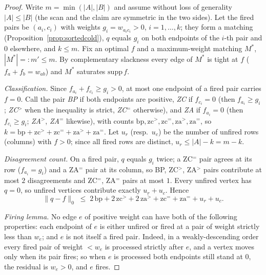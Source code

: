 \begin{proof}
Write $m=\min(|A|,|B|)$ and assume without loss of generality $|A| \le |B|$ (the
scan and the claim are symmetric in the two sides).  Let the fired pairs be
$(a_i,c_i)$ with weights $g_i = w_{a_i c_i} > 0$, $i = 1,\dots,k$; they form a
matching (Proposition~\ref{prop:sortedcold}), $q$ equals $g_i$ on both endpoints
of the $i$-th pair and $0$ elsewhere, and $k \le m$.  Fix an optimal $f$ and a
maximum-weight matching $M^*$, $|M^*| =: m' \le m$.  By complementary slackness
every edge of $M^*$ is tight at $f$ ($f_a + f_b = w_{ab}$) and $M^*$ saturates
$\mathrm{supp}\, f$.

\emph{Classification.}  Since $f_{a_i}+f_{c_i}\ge g_i>0$, at most one endpoint of
a fired pair carries $f=0$.  Call the pair \emph{BP} if both endpoints are
positive, \emph{ZC} if $f_{c_i}=0$ (then $f_{a_i}\ge g_i$; \emph{ZC$^>$} when the
inequality is strict, \emph{ZC$^=$} otherwise), and \emph{ZA} if $f_{a_i}=0$
(then $f_{c_i}\ge g_i$; \emph{ZA$^>$}, \emph{ZA$^=$} likewise), with counts
$\mathrm{bp},\mathrm{zc}^>,\mathrm{zc}^=,\mathrm{za}^>,\mathrm{za}^=$, so
$k=\mathrm{bp}+\mathrm{zc}^>+\mathrm{zc}^=+\mathrm{za}^>+\mathrm{za}^=$.  Let
$u_r$ (resp.\ $u_c$) be the number of unfired rows (columns) with $f>0$; since
all fired rows are distinct, $u_r \le |A|-k = m-k$.

\emph{Disagreement count.}  On a fired pair, $q$ equals $g_i$ twice; a ZC$^=$
pair agrees at its row ($f_{a_i}=g_i$) and a ZA$^=$ pair at its column, so BP,
ZC$^>$, ZA$^>$ pairs contribute at most $2$ disagreements and ZC$^=$, ZA$^=$
pairs at most $1$.  Every unfired vertex has $q=0$, so unfired vertices
contribute exactly $u_r+u_c$.  Hence
\begin{equation}\label{eq:dcount}
  \|q-f\|_0 \;\le\; 2\,\mathrm{bp} + 2\,\mathrm{zc}^> + 2\,\mathrm{za}^> +
  \mathrm{zc}^= + \mathrm{za}^= + u_r + u_c .
\end{equation}

\emph{Firing lemma.}  No edge $e$ of positive weight can have both of the
following properties: each endpoint of $e$ is either unfired or fired at a pair
of weight strictly less than $w_e$; and $e$ is not itself a fired pair.  Indeed,
in a weakly-descending order every fired pair of weight $< w_e$ is processed
strictly after $e$, and a vertex moves only when its pair fires; so when $e$ is
processed both endpoints still stand at $0$, the residual is $w_e > 0$, and $e$
fires.


\end{proof}
